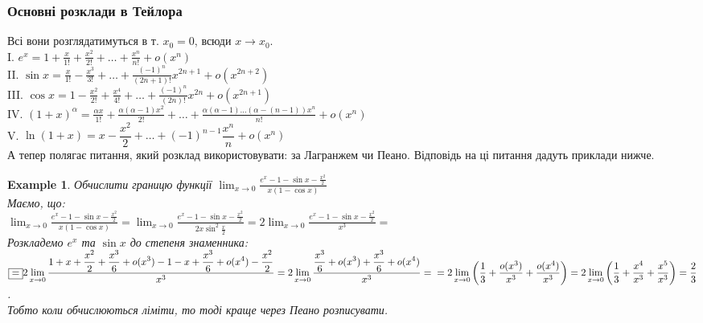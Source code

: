 \documentclass[a4paper, 14pt]{article}
\def\huge{\displaystyle}
\theoremstyle{theoremdd}
\theoremstyle{theoremdd}
\theoremstyle{theoremdd}
\theoremstyle{theoremdd}
\newtheorem{example}[theorem]{Example}
\theoremstyle{theoremdd}
\theoremstyle{theoremdd}
\theoremstyle{theoremdd}
\theoremstyle{theoremdd}
\begin{document}
\subsubsection*{Основні розклади в Тейлора}
Всі вони розглядатимуться в т. $x_0 = 0$, всюди $x \to x_0$.\\
I. $e^x \huge = 1 + \frac{x}{1!} + \frac{x^2}{2!} + \dots + \frac{x^n}{n!} + o(x^n)$\\
II. $\sin x \huge = \frac{x}{1!} - \frac{x^3}{3!} + \dots + \frac{(-1)^n}{(2n+1)!}x^{2n+1} + o(x^{2n+2})$\\
III. $\cos x \huge = 1 - \frac{x^2}{2!} + \frac{x^4}{4!} + \dots + \frac{(-1)^n}{(2n)!}x^{2n} + o(x^{2n+1})$\\
IV. $(1+x)^{\alpha} \huge = \frac{\alpha x}{1!} + \frac{\alpha (\alpha-1) x^2}{2!} + \dots + \frac{\alpha (\alpha-1)\dots(\alpha-(n-1)) x^n}{n!} + o(x^n)$\\
V. $\ln(1+x) = x - \dfrac{x^2}{2} + \dots + (-1)^{n-1} \dfrac{x^n}{n} + o(x^n)$
\bigskip \\
А тепер полягає питання, який розклад використовувати: за Лагранжем чи Пеано. Відповідь на ці питання дадуть приклади нижче.
\begin{example}
Обчислити границю функції $\huge \lim_{x \to 0} \frac{\huge e^x-1-\sin x - \frac{x^2}{2}}{x(1-\cos x)}$\\
Маємо, що:\\
$\huge \lim_{x \to 0} \frac{\huge e^x-1-\sin x - \frac{x^2}{2}}{x(1-\cos x)} = \lim_{x \to 0} \frac{\huge e^x - 1 - \sin x - \frac{x^2}{2}}{2x \sin^2 \frac{x}{2}} = 2\lim_{x \to 0} \frac{\huge e^x - 1 - \sin x - \frac{x^2}{2}}{x^3} \boxed{=} $\\
Розкладемо $e^x$ та $\sin x$ до степеня знаменника:\\
$\boxed{=} \huge 2\lim_{x \to 0} \frac{\displaystyle 1 + x + \frac{x^2}{2} + \frac{x^3}{6} + o(x^3) - 1 - x + \frac{x^3}{6} + o(x^4) - \frac{x^2}{2}}{x^3} = 2\lim_{x \to 0} \frac{\displaystyle \frac{x^3}{6} + o(x^3) + \frac{x^3}{6} + o(x^4)}{x^3} = \\ = 2 \lim_{x \to 0} \left(\frac{1}{3} + \frac{o(x^3)}{x^3} + \frac{o(x^4)}{x^3} \right) = 2 \lim_{x \to 0} \left(\frac{1}{3} + \frac{x^4}{x^3} + \frac{x^5}{x^3} \right) = \frac{2}{3}$.\\
\textit{Тобто коли обчислюються ліміти, то тоді краще через Пеано розписувати.}
\end{example}
\end{document}
